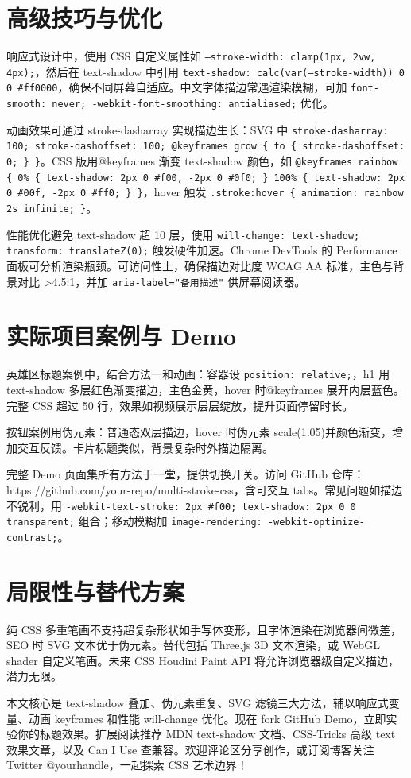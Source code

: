 \chapter{高级技巧与优化}
响应式设计中，使用 CSS 自定义属性如 \texttt{--stroke-width: clamp(1px, 2vw, 4px);}，然后在 text-shadow 中引用 \texttt{text-shadow: calc(var(--stroke-width)) 0 0 \#{}ff0000}，确保不同屏幕自适应。中文字体描边常遇渲染模糊，可加 \texttt{font-smooth: never; -webkit-font-smoothing: antialiased;} 优化。\par
动画效果可通过 stroke-dasharray 实现描边生长：SVG 中 \texttt{stroke-dasharray: 100; stroke-dashoffset: 100; @keyframes grow \{{} to \{{} stroke-dashoffset: 0; \}{} \}{}}。CSS 版用@keyframes 渐变 text-shadow 颜色，如 \texttt{@keyframes rainbow \{{} 0\%{} \{{} text-shadow: 2px 0 \#{}f00, -2px 0 \#{}0f0; \}{} 100\%{} \{{} text-shadow: 2px 0 \#{}00f, -2px 0 \#{}ff0; \}{} \}{}}，hover 触发 \texttt{.stroke:hover \{{} animation: rainbow 2s infinite; \}{}}。\par
性能优化避免 text-shadow 超 10 层，使用 \texttt{will-change: text-shadow; transform: translateZ(0);} 触发硬件加速。Chrome DevTools 的 Performance 面板可分析渲染瓶颈。可访问性上，确保描边对比度 WCAG AA 标准，主色与背景对比 >4.5:1，并加 \texttt{aria-label="备用描述"} 供屏幕阅读器。\par
\chapter{实际项目案例与 Demo}
英雄区标题案例中，结合方法一和动画：容器设 \texttt{position: relative;}，h1 用 text-shadow 多层红色渐变描边，主色金黄，hover 时@keyframes 展开内层蓝色。完整 CSS 超过 50 行，效果如视频展示层层绽放，提升页面停留时长。\par
按钮案例用伪元素：普通态双层描边，hover 时伪元素 scale(1.05)并颜色渐变，增加交互反馈。卡片标题类似，背景复杂时外描边隔离。\par
完整 Demo 页面集所有方法于一堂，提供切换开关。访问 GitHub 仓库：https://github.com/your-repo/multi-stroke-css，含可交互 tabs。常见问题如描边不锐利，用 \texttt{-webkit-text-stroke: 2px \#{}f00; text-shadow: 2px 0 0 transparent;} 组合；移动模糊加 \texttt{image-rendering: -webkit-optimize-contrast;}。\par
\chapter{局限性与替代方案}
纯 CSS 多重笔画不支持超复杂形状如手写体变形，且字体渲染在浏览器间微差，SEO 时 SVG 文本优于伪元素。替代包括 Three.js 3D 文本渲染，或 WebGL shader 自定义笔画。未来 CSS Houdini Paint API 将允许浏览器级自定义描边，潜力无限。\par
本文核心是 text-shadow 叠加、伪元素重复、SVG 滤镜三大方法，辅以响应式变量、动画 keyframes 和性能 will-change 优化。现在 fork GitHub Demo，立即实验你的标题效果。扩展阅读推荐 MDN text-shadow 文档、CSS-Tricks 高级 text 效果文章，以及 Can I Use 查兼容。欢迎评论区分享创作，或订阅博客关注 Twitter @yourhandle，一起探索 CSS 艺术边界！\par
